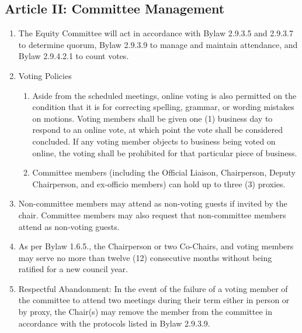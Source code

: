 \subsection{Article II: Committee Management}
\begin{enumerate}[label*=\arabic*., align=left]	
\item The Equity Committee will act in accordance with Bylaw 2.9.3.5 and 2.9.3.7 to determine quorum, Bylaw 2.9.3.9 to manage and maintain attendance, and Bylaw 2.9.4.2.1 to count votes.
\item Voting Policies
\begin{enumerate}[label*=\arabic*., align=left]	
\item Aside from the scheduled meetings, online voting is also permitted on the condition that it is for correcting spelling, grammar, or wording mistakes on motions. Voting members shall be given one (1) business day to respond to an online vote, at which point the vote shall be considered concluded. If any voting member objects to business being voted on online, the voting shall be prohibited for that particular piece of business.
\item Committee members (including the Official Liaison, Chairperson, Deputy Chairperson, and ex-officio members) can hold up to three (3) proxies.
\end{enumerate}
\item Non-committee members may attend as non-voting guests if invited by the chair. Committee members may also request that non-committee members attend as non-voting guests.
\item As per Bylaw 1.6.5., the Chairperson or two Co-Chairs, and voting members may serve no more than twelve (12) consecutive months without being ratified for a new council year.
\item Respectful Abandonment: In the event of the failure of a voting member of the committee to attend two meetings during their term either in person or by proxy, the Chair(s) may remove the member from the committee in accordance with the protocols listed in Bylaw 2.9.3.9.
\end{enumerate}

